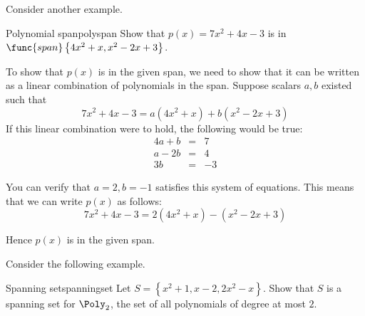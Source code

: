 Consider another example. 

\begin{example}{Polynomial span}{polyspan}
Show that $p(x) = 7x^2 + 4x - 3$ is in $\func{span}\left\{ 4x^2 + x, x^2 -2x + 3 \right\}$. 
\end{example}

\begin{solution}
To show that $p(x)$ is in the given span, we need to show that it can be written as a linear combination of polynomials in the span. Suppose scalars $a, b$ existed such that 
\[
7x^2 +4x - 3= a(4x^2+x) + b (x^2-2x+3) 
\]
If this linear combination were to hold, the following would be true:
\begin{eqnarray*}
4a + b &=& 7 \\
a - 2b &=& 4 \\
3b &=& -3 
\end{eqnarray*}

You can verify that $a = 2, b = -1$ satisfies this system of equations. This means that we can write $p(x)$ as follows:
\[
 7x^2 +4x-3= 2(4x^2+x)  - (x^2-2x+3) 
\]

Hence $p(x)$ is in the given span.
\end{solution}

Consider the following example.

\begin{example}{Spanning set}{spanningset}
Let $S = \left\{ x^2 + 1, x-2, 2x^2 - x \right\}$. Show that $S$ is a spanning set for $\Poly_2$, the set of all polynomials of degree at most $2$. 
\end{example}

